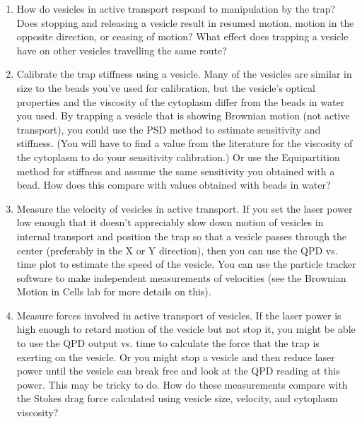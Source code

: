 \documentclass{../lab}
\begin{document}
\begin{enumerate}
    \item How do vesicles in active transport respond to manipulation by the trap? Does stopping and releasing a vesicle result in resumed motion, motion in the opposite direction, or ceasing of motion? What effect does trapping a vesicle have on other vesicles travelling the same route?

\newpage

    \item Calibrate the trap stiffness using a vesicle. Many of the vesicles are similar in size to the beads you've used for calibration, but the vesicle's optical properties and the viscosity of the cytoplasm differ from the beads in water you used. By trapping a vesicle that is showing Brownian motion (not active transport), you could use the PSD method to estimate sensitivity and stiffness. (You will have to find a value from the literature for the viscosity of the cytoplasm to do your sensitivity calibration.) Or use the Equipartition method for stiffness and assume the same sensitivity you obtained with a bead. How does this compare with values obtained with beads in water?

    \item Measure the velocity of vesicles in active transport. If you set the laser power low enough that it doesn't appreciably slow down motion of vesicles in internal transport and position the trap so that a vesicle passes through the center (preferably in the X or Y direction), then you can use the QPD vs. time plot to estimate the speed of the vesicle. You can use the particle tracker software to make independent measurements of velocities (see the Brownian Motion in Cells lab for more details on this).

    \item Measure forces involved in active transport of vesicles. If the laser power is high enough to retard motion of the vesicle but not stop it, you might be able to use the QPD output vs. time to calculate the force that the trap is exerting on the vesicle. Or you might stop a vesicle and then reduce laser power until the vesicle can break free and look at the QPD reading at this power. This may be tricky to do. How do these measurements compare with the Stokes drag force calculated using vesicle size, velocity, and cytoplasm viscosity?

\end{enumerate}

\end{document}
